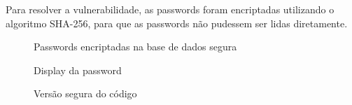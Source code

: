 \documentclass[12pt]{report}
\begin{document}
Para resolver a vulnerabilidade, as passwords foram encriptadas utilizando o algoritmo SHA-256, para que as passwords não pudessem ser lidas diretamente.

\begin{figure}[H]{
\centering
{
\caption{Passwords encriptadas na base de dados segura}
}
}\end{figure}

\begin{figure}[H]{
\centering
{
\caption{Display da password}
}
}\end{figure}

\begin{figure}[H]{
\centering
{
\caption{Versão segura do código}
}
}\end{figure}
\end{document}
